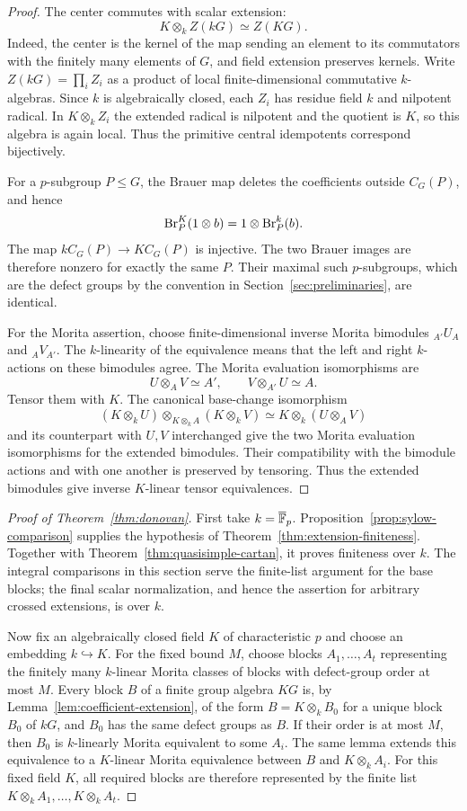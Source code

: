 \begin{proof}
The center commutes with scalar extension:
\[
 K\otimes_k Z(kG)\simeq Z(KG).
\]
Indeed, the center is the kernel of the map sending an element to its
commutators with the finitely many elements of $G$, and field extension
preserves kernels.  Write $Z(kG)=\prod_i Z_i$ as a product of local
finite-dimensional commutative $k$-algebras.  Since $k$ is algebraically
closed, each $Z_i$ has residue field $k$ and nilpotent radical.  In
$K\otimes_k Z_i$ the extended radical is nilpotent and the quotient is
$K$, so this algebra is again local.  Thus the primitive central
idempotents correspond bijectively.

For a $p$-subgroup $P\le G$, the Brauer map deletes the coefficients
outside $C_G(P)$, and hence
\[
 \operatorname{Br}_P^K(1\otimes b)=1\otimes\operatorname{Br}_P^k(b).
\]
The map $kC_G(P)\longrightarrow KC_G(P)$ is injective.  The two Brauer
images are therefore nonzero for exactly the same $P$.  Their maximal
such $p$-subgroups, which are the defect groups by the convention in
Section~\ref{sec:preliminaries}, are identical.

For the Morita assertion, choose finite-dimensional inverse Morita
bimodules ${}_{A'}U_A$ and ${}_A V_{A'}$.  The $k$-linearity of the
equivalence means that the left and right $k$-actions on these bimodules
agree.  The Morita evaluation isomorphisms are
\[
 U\otimes_A V\simeq A',\qquad
 V\otimes_{A'}U\simeq A.
\]
Tensor them with $K$.  The canonical base-change isomorphism
\[
 (K\otimes_k U)\otimes_{K\otimes_k A}(K\otimes_k V)
   \simeq K\otimes_k(U\otimes_A V)
\]
and its counterpart with $U,V$ interchanged give the two Morita
evaluation isomorphisms for the extended bimodules.  Their compatibility
with the bimodule actions and with one another is preserved by tensoring.
Thus the extended bimodules give inverse $K$-linear tensor equivalences.
\end{proof}

\begin{proof}[Proof of Theorem~\ref{thm:donovan}]
First take $k=\overline{\mathbb F}_p$.  Proposition~\ref{prop:sylow-comparison}
supplies the hypothesis of Theorem~\ref{thm:extension-finiteness}.
Together with Theorem~\ref{thm:quasisimple-cartan}, it proves finiteness
over $k$.  The integral comparisons in this section serve the finite-list
argument for the base blocks; the final scalar normalization, and hence
the assertion for arbitrary crossed extensions, is over $k$.

Now fix an algebraically closed field $K$ of characteristic $p$ and
choose an embedding $k\hookrightarrow K$.  For the fixed bound $M$,
choose blocks $A_1,\ldots,A_t$ representing the finitely many
$k$-linear Morita classes of blocks with defect-group order at most $M$.
Every block $B$ of a finite group algebra $KG$ is, by
Lemma~\ref{lem:coefficient-extension}, of the form
$B=K\otimes_k B_0$ for a unique block $B_0$ of $kG$, and $B_0$ has the
same defect groups as $B$.  If their order is at most $M$, then $B_0$ is
$k$-linearly Morita equivalent to some $A_i$.  The same lemma extends
this equivalence to a $K$-linear Morita equivalence between $B$ and
$K\otimes_k A_i$.  For this fixed field $K$, all required blocks are
therefore represented by the finite list
$K\otimes_k A_1,\ldots,K\otimes_k A_t$.
\end{proof}
